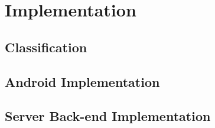 \chapter{Implementation}\label{cha3}

\section{Classification}

\section{Android Implementation}

\section{Server Back-end Implementation}

